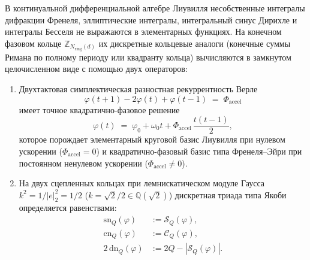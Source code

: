\documentclass[11pt,a4paper]{article}
\theoremstyle{plain}
\theoremstyle{definition}
\begin{document}
В континуальной дифференциальной алгебре Лиувилля несобственные интегралы дифракции Френеля, эллиптические интегралы, интегральный синус Дирихле и интегралы Бесселя не выражаются в элементарных функциях. На конечном фазовом кольце $\mathbb{Z}_{N_{\mathrm{ring}}(d)}$ их дискретные кольцевые аналоги (конечные суммы Римана по полному периоду или квадранту кольца) вычисляются в замкнутом целочисленном виде с помощью двух операторов:
\begin{enumerate}[leftmargin=*]
\item Двухтактовая симплектическая разностная рекуррентность Верле
  \begin{equation}
    \label{eq:verlet-recurrence}
    \varphi(t+1) - 2\varphi(t) + \varphi(t-1) \;=\; \Phi_{\mathrm{accel}}
  \end{equation}
  имеет точное квадратично-фазовое решение
  \begin{equation}
    \label{eq:verlet-parabola}
    \varphi(t) \;=\; \varphi_0 + \omega_0 t + \Phi_{\mathrm{accel}}\,\frac{t(t-1)}{2},
  \end{equation}
  которое порождает элементарный круговой базис Лиувилля при нулевом ускорении ($\Phi_{\mathrm{accel}} = 0$) и квадратично-фазовый базис типа Френеля--Эйри при постоянном ненулевом ускорении ($\Phi_{\mathrm{accel}} \ne 0$).
\item На двух сцепленных кольцах при лемнискатическом модуле Гаусса $k^2 = 1/|e|_2^2 = 1/2$ ($k = \sqrt{2}/2 \in \mathbb{Q}(\sqrt{2})$) дискретная триада типа Якоби определяется равенствами:
  \begin{align}
    \mathrm{sn}_Q(\varphi) &:= \mathcal{S}_Q(\varphi), \label{eq:jacobi-sn} \\
    \mathrm{cn}_Q(\varphi) &:= \mathcal{C}_Q(\varphi), \label{eq:jacobi-cn} \\
    2\,\mathrm{dn}_Q(\varphi) &:= 2Q - |\mathcal{S}_Q(\varphi)|. \label{eq:jacobi-dn}
  \end{align}
\end{enumerate}
\end{document}
